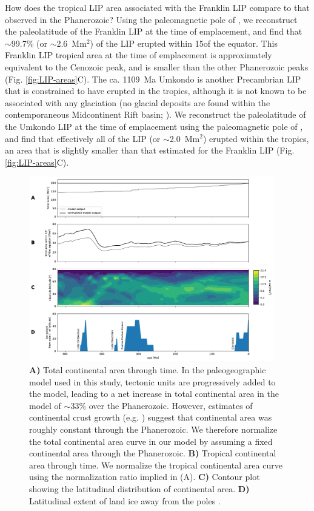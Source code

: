 How does the tropical LIP area associated with the Franklin LIP compare to that observed in the Phanerozoic? Using the paleomagnetic pole of \citet{Denyszyn2009a}, we reconstruct the paleolatitude of the Franklin LIP at the time of emplacement, and find that $\sim$99.7\% (or $\sim$2.6~Mm$^{2}$) of the LIP erupted within 15\degrees of the equator. This Franklin LIP tropical area at the time of emplacement is approximately equivalent to the Cenozoic peak, and is smaller than the other Phanerozoic peaks (Fig. \ref{fig:LIP-areas}C). The ca. 1109~Ma Umkondo is another Precambrian LIP that is constrained to have erupted in the tropics, although it is not known to be associated with any glaciation (no glacial deposits are found within the contemporaneous Midcontinent Rift basin; \citealp{Swanson-Hysell2019a}). We reconstruct the paleolatitude of the Umkondo LIP at the time of emplacement using the paleomagnetic pole of \citet{Swanson-Hysell2015b}, and find that effectively all of the LIP (or $\sim$2.0~Mm$^{2}$) erupted within the tropics, an area that is slightly smaller than that estimated for the Franklin LIP (Fig. \ref{fig:LIP-areas}C).

\begin{figure}[h!]
\begin{center}
	\includegraphics[width=0.95\textwidth]{figures/LIPs/continent-areas.pdf}
	\caption[Reconstructed continental areas.]{\textbf{A)} Total continental area through time. In the paleogeographic model used in this study, tectonic units \citep{Torsvik2016a} are progressively added to the model, leading to a net increase in total continental area in the model of $\sim$33\% over the Phanerozoic. However, estimates of continental crust growth (e.g. \citealp{Pujol2013a}) suggest that continental area was roughly constant through the Phanerozoic. We therefore normalize the total continental area curve in our model by assuming a fixed continental area through the Phanerozoic. \textbf{B)} Tropical continental area through time. We normalize the tropical continental area curve using the normalization ratio implied in (A). \textbf{C)} Contour plot showing the latitudinal distribution of continental area. \textbf{D)} Latitudinal extent of land ice away from the poles \citep{Macdonald2019a}.}
	\label{fig:continent-areas}
\end{center}
\end{figure}


